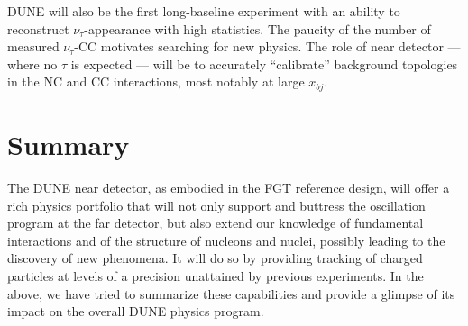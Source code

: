 DUNE will also be the first long-baseline experiment with an ability
to reconstruct $\nu_\tau$-appearance with high statistics. The paucity
of the number of measured $\nu_\tau$-CC motivates searching for new
physics.  The role of near detector --- where no $\tau$ is expected
--- will be to accurately ``calibrate'' background topologies in the
NC and CC interactions, most notably at large $x_{bj}$.


\section{Summary}
\label{sec:physics-nd-summary}


The DUNE near detector, as embodied in the FGT reference design, will
offer a rich physics portfolio that will not only support and buttress
the oscillation program at the far detector, but also extend our
knowledge of fundamental interactions and of the structure of nucleons
and nuclei, possibly leading to the discovery of new phenomena. It
will do so by providing tracking of charged particles at levels of a
precision unattained by previous experiments.  In the above, we have
tried to summarize these capabilities and provide a glimpse of its
impact on the overall DUNE physics program.



%


